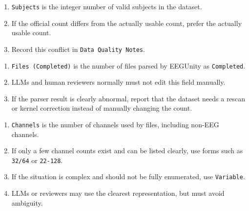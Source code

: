 \begin{tcolorbox}
\smallskip{}\par\smallskip

\begin{enumerate}[leftmargin=1.5em,noitemsep,topsep=2pt]
\item \texttt{Subjects} is the integer number of valid subjects in the dataset.
\item If the official count differs from the actually usable count, prefer the actually usable count.
\item Record this conflict in \texttt{Data Quality Notes}.
\end{enumerate}

\smallskip{}\par\smallskip

\begin{enumerate}[leftmargin=1.5em,noitemsep,topsep=2pt]
\item \texttt{Files (Completed)} is the number of files parsed by EEGUnity as \texttt{Completed}.
\item LLMs and human reviewers normally must not edit this field manually.
\item If the parser result is clearly abnormal, report that the dataset needs a rescan or kernel correction instead of manually changing the count.
\end{enumerate}

\smallskip{}\par\smallskip

\begin{enumerate}[leftmargin=1.5em,noitemsep,topsep=2pt]
\item \texttt{Channels} is the number of channels used by files, including non-EEG channels.
\item If only a few channel counts exist and can be listed clearly, use forms such as \texttt{32/64} or \texttt{22-128}.
\item If the situation is complex and should not be fully enumerated, use \texttt{Variable}.
\item LLMs or reviewers may use the clearest representation, but must avoid ambiguity.
\end{enumerate}

\smallskip{}\par\smallskip


\end{tcolorbox}
